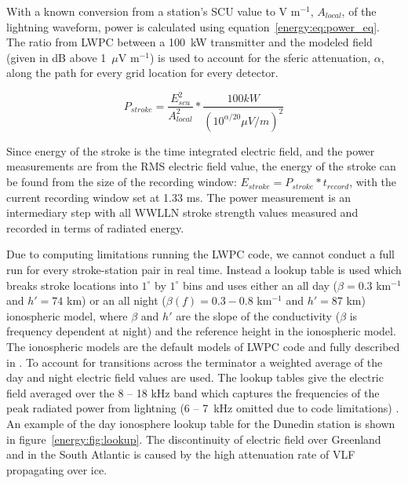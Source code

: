 With a known conversion from a station's SCU value to V m$^{-1}$, $A_{local}$, of the lightning waveform, power is calculated using equation~\ref{energy:eq:power_eq}.
The ratio from LWPC between a 100~kW transmitter and the modeled field (given in dB above 1~$\mu$V m$^{-1}$) is used to account for the sferic attenuation, $\alpha$, along the path for every grid location for every detector.

\begin{equation}
P_{stroke}=\frac{E_{scu}^2}{A_{local}^2} * \frac{100kW}{(10^{\alpha/20}\mu V/m)^2}
\label{energy:eq:power_eq}
\end{equation}

Since energy of the stroke is the time integrated electric field, and the power measurements are from the RMS electric field value, the energy of the stroke can be found from the size of the recording window: $E_{stroke}=P_{stroke} * t_{record}$, with the current recording window set at 1.33 ms.
The power measurement is an intermediary step with all WWLLN stroke strength values measured and recorded in terms of radiated energy.

Due to computing limitations running the LWPC code, we cannot conduct a full run for every stroke-station pair in real time.
Instead a lookup table is used which breaks stroke locations into $1^{\circ}$ by $1^{\circ}$ bins and uses either an all day ($\beta=0.3$ km$^{-1}$ and $h'=74$ km) or an all night ($\beta(f)=0.3-0.8$ km$^{-1}$ and $h'=87$ km) ionospheric model, where $\beta$ and $h'$ are the slope of the conductivity ($\beta$ is frequency dependent at night) and the reference height in the ionospheric model.
The ionospheric models are the default models of LWPC code and fully described in \citet{Ferguson1998}. 
To account for transitions across the terminator a weighted average of the day and night electric field values are used.
The lookup tables give the electric field averaged over the 8 -- 18 kHz band which captures the frequencies of the peak radiated power from lightning (6 -- 7~kHz omitted due to code limitations) \citep{Volland1995}.
An example of the day ionosphere lookup table for the Dunedin station is shown in figure~\ref{energy:fig:lookup}.
The discontinuity of electric field over Greenland and in the South Atlantic is caused by the high attenuation rate of VLF propagating over ice.

